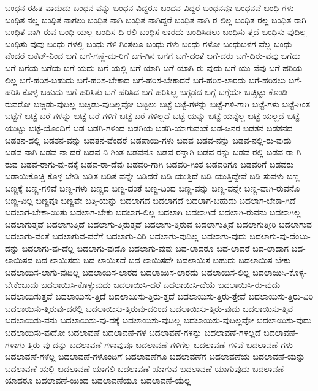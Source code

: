 {ಬಂಧನ-ರಹಿತ-ವಾದುದು
ಬಂಧನ-ವನ್ನು
ಬಂಧನ-ವಿದ್ದರೂ
ಬಂಧನ-ವಿದ್ದರೆ
ಬಂಧನವೂ
ಬಂಧನವೆ
ಬಂಧಿ-ಗಳು
ಬಂಧಿತ-ನಲ್ಲ
ಬಂಧಿತ-ನಾಗಲು
ಬಂಧಿತ-ನಾಗಿ
ಬಂಧಿತ-ನಾಗಿದ್ದರೆ
ಬಂಧಿತ-ನಾಗಿ-ರ-ಲಿಲ್ಲ
ಬಂಧಿತ-ರಲ್ಲ
ಬಂಧಿತ-ರಾಗಿ
ಬಂಧಿತ-ವಾಗಿ-ರುವ
ಬಂಧಿ-ಯಲ್ಲ
ಬಂಧಿಸ-ದಿ-ರಲಿ
ಬಂಧಿಸ-ಲಾರದು
ಬಂಧಿಸಿಡಲು
ಬಂಧಿಸು-ತ್ತದೆ
ಬಂಧಿಸು-ವುದಿಲ್ಲ
ಬಂಧಿಸು-ವುವು
ಬಂಧು-ಗಳಲ್ಲಿ
ಬಂಧು-ಗಳಿ-ಗಿಂತಲೂ
ಬಂಧು-ಗಳು
ಬಂಧು-ಗಳೋ
ಬಂಧುಬಳಗ-ವೆಲ್ಲ
ಬಂಧು-ವೆಂದರೆ
ಬಕೆಟ್-ನಿಂದ
ಬಗೆ
ಬಗೆ-ಗಣ್ಣೆ-ದು-ರಿಗೆ
ಬಗೆ-ಗಿನ
ಬಗೆಗೆ
ಬಗೆ-ದಂತೆ
ಬಗೆ-ದರು
ಬಗೆ-ದಿರು-ವೆವು
ಬಗೆದು
ಬಗೆ-ಬಗೆಯ
ಬಗೆಯ
ಬಗೆ-ಯದು
ಬಗೆ-ಯಲ್ಲಿ
ಬಗೆ-ಯಾಗಿ
ಬಗೆ-ಯಾಗಿ-ರು-ವುದು
ಬಗೆ-ಯು-ವೆವು
ಬಗೆ-ಹರಿಯ-ಲಿಲ್ಲ
ಬಗೆ-ಹರಿಸ-ಬಹುದು
ಬಗೆ-ಹರಿಸ-ಬೇಕಾದ
ಬಗೆ-ಹರಿಸ-ಬೇಕಾದರೆ
ಬಗೆ-ಹರಿಸ-ಲಾರದು
ಬಗೆ-ಹರಿಸಲು
ಬಗೆ-ಹರಿಸಿ-ಕೊಳ್ಳ-ಬಹುದು
ಬಗೆ-ಹರಿಸಿತು
ಬಗೆ-ಹರಿಸಿದ
ಬಗೆ-ಹರಿಸಿಲ್ಲ
ಬಗ್ಗಡದ
ಬಗ್ಗೆ
ಬಗ್ಗೆಯೇ
ಬಚ್ಚಿಟ್ಟು-ಕೊಂಡಿ-ರುವರೋ
ಬಚ್ಚಿಡು-ವುದಿಲ್ಲ
ಬಚ್ಚಿಡು-ವುದಿಲ್ಲವೋ
ಬಟ್ಟಲು
ಬಟ್ಟೆ
ಬಟ್ಟೆ-ಗಳನ್ನು
ಬಟ್ಟೆ-ಗಳಿ-ಗಾಗಿ
ಬಟ್ಟೆ-ಗಳು
ಬಟ್ಟೆ-ಗಿಂತ
ಬಟ್ಟೆಗೆ
ಬಟ್ಟೆ-ಬರೆ-ಗಳನ್ನು
ಬಟ್ಟೆ-ಬರೆ-ಗಳಿಗೆ
ಬಟ್ಟೆ-ಬರೆ-ಗಳಿಲ್ಲದೆ
ಬಟ್ಟೆ-ಯನ್ನು
ಬಟ್ಟೆ-ಯನ್ನೆಲ್ಲ
ಬಟ್ಟೆ-ಯಲ್ಲದೆ
ಬಟ್ಟೆ-ಯುಟ್ಟು
ಬಟ್ಟೆ-ಯೊಂದಿಗೆ
ಬಡ
ಬಡಗಿ-ಗಳಿಂದ
ಬಡಗಿಯ
ಬಡಗಿ-ಯಾಗುವಂತೆ
ಬಡ-ಜನರ
ಬಡತನ
ಬಡತನದ
ಬಡತನ-ದಲ್ಲಿ
ಬಡತನ-ವನ್ನು
ಬಡತನ-ವೆಂದರೆ
ಬಡಪಾಯಿ-ಗಳು
ಬಡವ
ಬಡವ-ನನ್ನು
ಬಡವ-ನಲ್ಲಿ-ರು-ವುದು
ಬಡವ-ನಾಗಿ
ಬಡವ-ನಾ-ದರೆ
ಬಡವ-ನಿ-ಗಿಂತ
ಬಡವನೂ
ಬಡವ-ರನ್ನಾಗಿ
ಬಡವ-ರನ್ನು
ಬಡವ-ರಲ್ಲಿ
ಬಡವ-ರಾ-ಗಿ-ರುವ
ಬಡವ-ರಾಗು-ವು-ದಕ್ಕೆ
ಬಡವ-ರಾ-ದೆವು
ಬಡವರಿ-ಗಾಗಿ
ಬಡವರಿ-ಗಿಂತ
ಬಡವರಿಗೂ
ಬಡವರಿಗೆ
ಬಡವರು
ಬಡಾಯಿಕೊಚ್ಚಿ-ಕೊಳ್ಳ-ಬೇಡಿ
ಬಡಿತ
ಬಡಿತ-ವನ್ನೇ
ಬಡಿದರೆ
ಬಡಿ-ಯುತ್ತಿದೆ
ಬಡಿ-ಯುತ್ತಿದ್ದೇವೆ
ಬಡಿ-ಸುವಳು
ಬಣ್ಣ
ಬಣ್ಣಕ್ಕೆ
ಬಣ್ಣ-ಗಳಿವೆ
ಬಣ್ಣ-ಗಳು
ಬಣ್ಣದ
ಬಣ್ಣ-ದಂತೆ
ಬಣ್ಣ-ದಿಂದ
ಬಣ್ಣ-ವನ್ನು
ಬಣ್ಣ-ವನ್ನೇ
ಬಣ್ಣ-ವಾಗಿ-ರುವನೊ
ಬಣ್ಣ-ವಿಲ್ಲ
ಬಣ್ಣವೂ
ಬಣ್ಣವೇ
ಬತ್ತಿ-ಯನ್ನು
ಬದಲಾಗದ
ಬದಲಾಗದೆ
ಬದಲಾಗ-ಬಹುದು
ಬದಲಾಗ-ಬೇಕಾ-ಗಿದೆ
ಬದಲಾಗ-ಬೇಕಾ-ಯಿತು
ಬದಲಾಗ-ಬೇಕು
ಬದಲಾಗ-ಲಿಲ್ಲ
ಬದಲಾಗಿ
ಬದಲಾಗಿದೆ
ಬದಲಾಗಿ-ರುವನು
ಬದಲಾಗಿಲ್ಲ
ಬದಲಾಗುತ್ತವೆ
ಬದಲಾಗುತ್ತಿದೆ
ಬದಲಾಗು-ತ್ತಿರುತ್ತದೆ
ಬದಲಾಗು-ತ್ತಿರುವ
ಬದಲಾಗುತ್ತಿವೆ
ಬದಲಾಗುತ್ತೀರಿ
ಬದಲಾಗುವ
ಬದಲಾಗು-ವಂತೆ
ಬದಲಾಗುವ-ವರೆಗೆ
ಬದಲಾಗು-ವಿರಿ
ಬದಲಾಗು-ವುದಿಲ್ಲ
ಬದಲಾಗು-ವುದು
ಬದಲಾಗು-ವು-ದೆಂಬು-ದನ್ನು
ಬದಲಾಗು-ವು-ದೆಲ್ಲ
ಬದಲಾಗು-ವುದೊ
ಬದಲಾಗು-ವುವು
ಬದ-ಲಾದರೂ
ಬದ-ಲಾದರೆ
ಬದ-ಲಾದಾಗ
ಬದ-ಲಾಯಿಸದ
ಬದ-ಲಾಯಿಸದು
ಬದ-ಲಾಯಿಸದೆ
ಬದ-ಲಾಯಿಸದೇ
ಬದಲಾಯಿಸ-ಬಹುದು
ಬದಲಾಯಿಸ-ಬೇಕು
ಬದಲಾಯಿಸ-ಲಾಗು-ವುದಿಲ್ಲ
ಬದಲಾಯಿಸ-ಲಾರದ
ಬದಲಾಯಿಸ-ಲಾರದು
ಬದಲಾಯಿಸ-ಲಿಲ್ಲ
ಬದಲಾಯಿಸಿ-ಕೊಳ್ಳ-ಬೇಕೆಂಬುದು
ಬದಲಾಯಿಸಿ-ಕೊಳ್ಳುವುದು
ಬದಲಾಯಿಸಿ-ದರೆ
ಬದಲಾಯಿಸಿ-ದೆಯೆ
ಬದಲಾಯಿಸಿ-ರು-ವುದು
ಬದಲಾಯಿಸುತ್ತವೆ
ಬದಲಾಯಿಸು-ತ್ತಿದೆ
ಬದಲಾಯಿಸು-ತ್ತಿರು-ತ್ತದೆ
ಬದಲಾಯಿಸು-ತ್ತಿರು-ತ್ತೇವೆ
ಬದಲಾಯಿಸು-ತ್ತಿರು-ವಿರಿ
ಬದಲಾಯಿಸು-ತ್ತಿರುವು-ದರಲ್ಲಿ
ಬದಲಾಯಿಸು-ತ್ತಿರುವು-ದರಿಂದ
ಬದಲಾಯಿಸು-ತ್ತಿರು-ವುದು
ಬದಲಾಯಿಸು-ತ್ತಿವೆ
ಬದಲಾಯಿಸು-ವನು
ಬದಲಾಯಿಸು-ವು-ದಕ್ಕೆ
ಬದಲಾಯಿಸು-ವುದಿಲ್ಲ
ಬದಲಾಯಿಸು-ವುದಿಲ್ಲವೋ
ಬದಲಾಯಿಸು-ವುದು
ಬದಲಾಯಿಸು-ವುದೋ
ಬದಲಾವಣೆ
ಬದಲಾವಣೆ-ಗಳ
ಬದಲಾವಣೆ-ಗಳನ್ನು
ಬದಲಾವಣೆ-ಗಳಲ್ಲದೆ
ಬದಲಾವಣೆ-ಗಳಾಗು-ತ್ತಿರು-ವು-ದನ್ನು
ಬದಲಾವಣೆ-ಗಳಾವುವೂ
ಬದಲಾವಣೆ-ಗಳಿಗೆಲ್ಲ
ಬದಲಾವಣೆ-ಗಳಿವೆ
ಬದಲಾವಣೆ-ಗಳು
ಬದಲಾವಣೆ-ಗಳೆಲ್ಲ
ಬದಲಾವಣೆ-ಗಳೊಂದಿಗೆ
ಬದಲಾವಣೆಗೂ
ಬದಲಾವಣೆಗೆ
ಬದಲಾವಣೆಯ
ಬದಲಾವಣೆ-ಯನ್ನು
ಬದಲಾವಣೆ-ಯಲ್ಲಿ
ಬದಲಾವಣೆ-ಯಾಗಲಿ
ಬದಲಾವಣೆ-ಯಾಗುವ
ಬದಲಾವಣೆ-ಯಾಗುವುದು
ಬದಲಾವಣೆ-ಯಾದರೂ
ಬದಲಾವಣೆ-ಯಿಂದ
ಬದಲಾವಣೆಯೂ
ಬದಲಾವಣೆ-ಯೆಲ್ಲ
}
